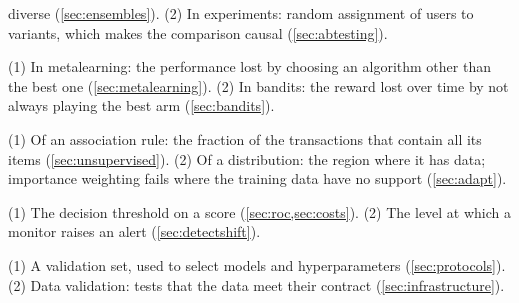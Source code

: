 \begin{description}
diverse (\cref{sec:ensembles}). (2) In experiments: random assignment of users to variants, which
makes the comparison causal (\cref{sec:abtesting}).
\item[Regret] (1) In metalearning: the performance lost by choosing an algorithm other than the best
one (\cref{sec:metalearning}). (2) In bandits: the reward lost over time by not always playing the
best arm (\cref{sec:bandits}).
\item[Support] (1) Of an association rule: the fraction of the transactions that contain all its
items (\cref{sec:unsupervised}). (2) Of a distribution: the region where it has data; importance
weighting fails where the training data have no support (\cref{sec:adapt}).
\item[Threshold] (1) The decision threshold on a score (\cref{sec:roc,sec:costs}). (2) The level at
which a monitor raises an alert (\cref{sec:detectshift}).
\item[Validation] (1) A validation set, used to select models and hyperparameters
(\cref{sec:protocols}). (2) Data validation: tests that the data meet their contract
(\cref{sec:infrastructure}).
\end{description}
